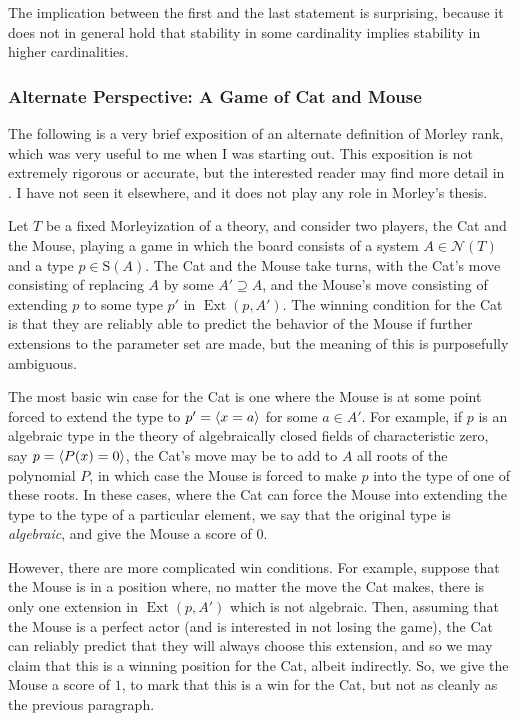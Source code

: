 \documentclass{article}
\theoremstyle{nonumberplain}
\newcommand{\calN}{\mathcal{N}}
\newcommand{\Stone}{\mathrm{S}}
\DeclareMathOperator{\Ext}{Ext}
\DeclarePairedDelimiter{\braket}{\langle}{\rangle}
\begin{document}
The implication between the first and the last statement is surprising, because it does not in general hold that stability in some cardinality implies stability in higher cardinalities.

\subsubsection{Alternate Perspective: A Game of Cat and Mouse}

The following is a very brief exposition of an alternate definition of Morley rank, which was very useful to me when I was starting out. This exposition is not extremely rigorous or accurate, but the interested reader may find more detail in \cite{myself_morley_rank}. I have not seen it elsewhere, and it does not play any role in Morley's thesis.

Let $T$ be a fixed Morleyization of a theory, and consider two players, the Cat and the Mouse, playing a game in which the board consists of a system $A \in \calN(T)$ and a type $p \in \Stone(A)$. The Cat and the Mouse take turns, with the Cat's move consisting of replacing $A$ by some $A' \supseteq A$, and the Mouse's move consisting of extending $p$ to some type $p'$ in $\Ext(p,A')$. The winning condition for the Cat is that they are reliably able to predict the behavior of the Mouse if further extensions to the parameter set are made, but the meaning of this is purposefully ambiguous.

The most basic win case for the Cat is one where the Mouse is at some point forced to extend the type to $p' = \braket{x = a}$ for some $a \in A'$. For example, if $p$ is an algebraic type in the theory of algebraically closed fields of characteristic zero, say $p = \braket{P(x) = 0}$, the Cat's move may be to add to $A$ all roots of the polynomial $P$, in which case the Mouse is forced to make $p$ into the type of one of these roots. In these cases, where the Cat can force the Mouse into extending the type to the type of a particular element, we say that the original type is \emph{algebraic}, and give the Mouse a score of $0$.

However, there are more complicated win conditions. For example, suppose that the Mouse is in a position where, no matter the move the Cat makes, there is only one extension in $\Ext(p,A')$ which is not algebraic. Then, assuming that the Mouse is a perfect actor (and is interested in not losing the game), the Cat can reliably predict that they will always choose this extension, and so we may claim that this is a winning position for the Cat, albeit indirectly. So, we give the Mouse a score of $1$, to mark that this is a win for the Cat, but not as cleanly as the previous paragraph.
\end{document}
